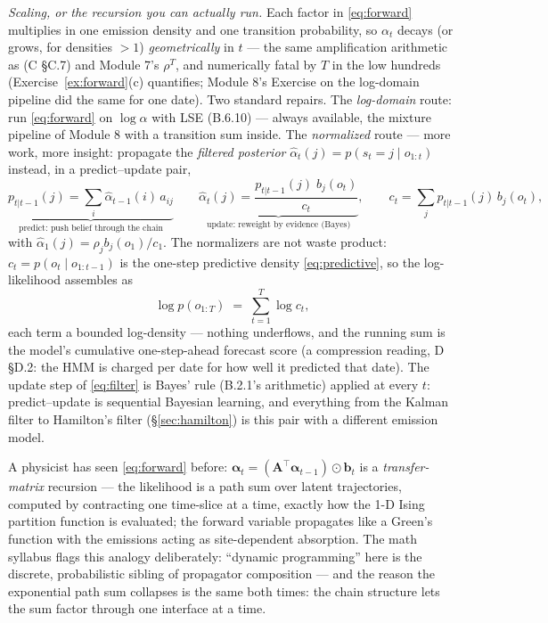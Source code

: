 \documentclass[11pt]{article}
\numberwithin{equation}{section}
\theoremstyle{plain}
\theoremstyle{definition}
\theoremstyle{remark}
\newcommand{\T}{\top}
\newcommand{\bA}{\bm{A}}
\newcommand{\alh}{\hat{\alpha}}
\begin{document}
\emph{Scaling, or the recursion you can actually run.} Each factor in \eqref{eq:forward} multiplies in one emission density and one transition probability, so $\alpha_t$ decays (or grows, for densities $> 1$) \emph{geometrically} in $t$ --- the same amplification arithmetic as (C \S C.7) and Module 7's $\rho^T$, and numerically fatal by $T$ in the low hundreds (Exercise~\ref{ex:forward}(c) quantifies; Module 8's Exercise on the log-domain pipeline did the same for one date). Two standard repairs. The \emph{log-domain} route: run \eqref{eq:forward} on $\log \alpha$ with LSE (B.6.10) --- always available, the mixture pipeline of Module 8 with a transition sum inside. The \emph{normalized} route --- more work, more insight: propagate the \emph{filtered posterior} $\alh_t(j) = p(s_t = j \mid o_{1:t})$ instead, in a predict--update pair,
\begin{equation}
\underbrace{p_{t|t-1}(j) = \sum_i \alh_{t-1}(i)\, a_{ij}}_{\text{predict: push belief through the chain}}
\qquad
\underbrace{\alh_t(j) = \frac{p_{t|t-1}(j)\; b_j(o_t)}{c_t}}_{\text{update: reweight by evidence (Bayes)}},
\qquad
c_t = \sum_j p_{t|t-1}(j)\, b_j(o_t),
\label{eq:filter}
\end{equation}
with $\alh_1(j) = \rho_j b_j(o_1)/c_1$. The normalizers are not waste product: $c_t = p(o_t \mid o_{1:t-1})$ is the one-step predictive density \eqref{eq:predictive}, so the log-likelihood assembles as
\begin{equation}
\log p(o_{1:T}) \;=\; \sum_{t=1}^{T} \log c_t ,
\label{eq:loglik}
\end{equation}
each term a bounded log-density --- nothing underflows, and the running sum is the model's cumulative one-step-ahead forecast score (a compression reading, D \S D.2: the HMM is charged per date for how well it predicted that date). The update step of \eqref{eq:filter} is Bayes' rule (B.2.1's arithmetic) applied at every $t$: predict--update is sequential Bayesian learning, and everything from the Kalman filter to Hamilton's filter (\S\ref{sec:hamilton}) is this pair with a different emission model.

\begin{necbox}
A physicist has seen \eqref{eq:forward} before: $\bm\alpha_t = (\bA^\T \bm\alpha_{t-1}) \odot \bm b_t$ is a \emph{transfer-matrix} recursion --- the likelihood is a path sum over latent trajectories, computed by contracting one time-slice at a time, exactly how the 1-D Ising partition function is evaluated; the forward variable propagates like a Green's function with the emissions acting as site-dependent absorption. The math syllabus flags this analogy deliberately: ``dynamic programming'' here is the discrete, probabilistic sibling of propagator composition --- and the reason the exponential path sum collapses is the same both times: the chain structure lets the sum factor through one interface at a time.
\end{necbox}
\end{document}
